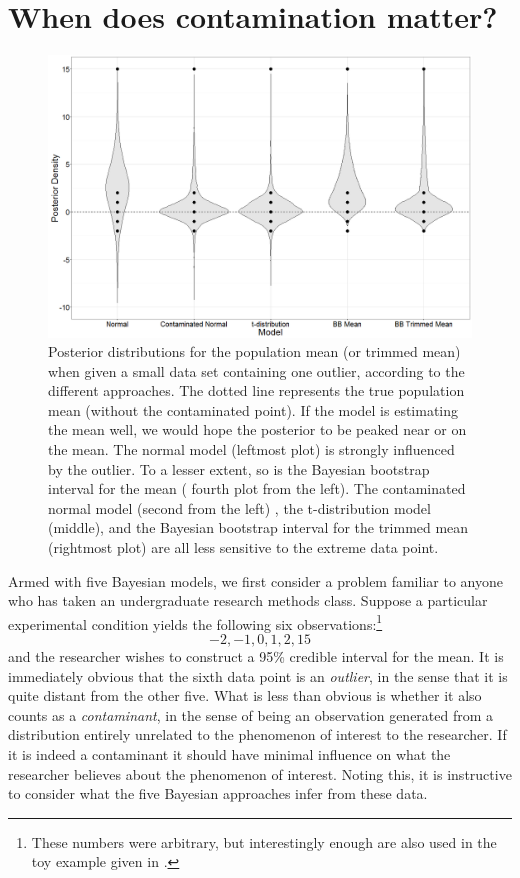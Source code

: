 \documentclass[doc]{apa6}
\begin{document}
{\section{When does contamination matter?}


\begin{figure}[t]
    \centering
    \includegraphics[width=14cm]{violins.png}
    \caption{Posterior distributions for the population mean (or trimmed mean) when given a small data set containing one outlier, according to the       different approaches.   The dotted line represents the true population mean (without the contaminated point). If the model is estimating the mean well, we would hope the posterior to be peaked near or on the mean.   The normal model (leftmost plot) is strongly influenced by the outlier. To a lesser extent, so is the Bayesian bootstrap interval for the mean (    fourth   plot from the left). The contaminated normal model (second from the left)  , the t-distribution model (middle),   and the Bayesian bootstrap interval for the trimmed mean (rightmost plot) are all less sensitive to the extreme data point.}
    \label{violins}
\end{figure}

Armed with     five   Bayesian models, we first consider a problem familiar to anyone who has taken an undergraduate research methods class. Suppose a particular experimental condition yields the following six observations:\footnote{  These numbers were arbitrary, but interestingly enough are also used in the toy example given in \textcite[][Figure 16.5, p. 460]{kruschke2014doing}.}
$$
-2,-1,0,1,2,15
$$
and the researcher wishes to construct a 95\% credible interval for the mean. It is immediately obvious that the sixth data point is an {\it outlier}, in the sense that it is quite distant from the other five. What is less than obvious is whether it also counts as a {\it contaminant}, in the sense of being an observation generated from a distribution entirely unrelated to the phenomenon of interest to the researcher. If it is indeed a contaminant it should have minimal influence on what the researcher believes about the phenomenon of interest. Noting this, it is instructive to consider what the     five   Bayesian approaches infer from these data.

}
\end{document}

